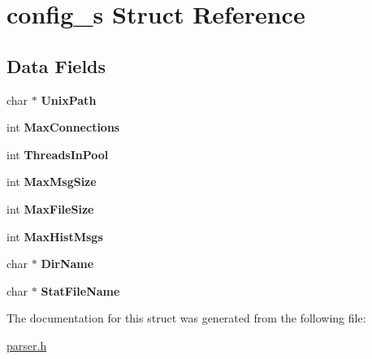 \hypertarget{structconfig__s}{}\section{config\+\_\+s Struct Reference}
\label{structconfig__s}
\subsection*{Data Fields}
\begin{DoxyCompactItemize}
\item 
\mbox{\label{structconfig__s_ab13f2c10dc85ac86a157ab17f7559e9f}} 
char $\ast$ {\bfseries Unix\+Path}
\item 
\mbox{\label{structconfig__s_a754a11e0baafd4ee9c91b521fac3902d}} 
int {\bfseries Max\+Connections}
\item 
\mbox{\label{structconfig__s_aeaf2a7c88ebe97aa191a8c09dfd4c702}} 
int {\bfseries Threads\+In\+Pool}
\item 
\mbox{\label{structconfig__s_adc4e7e822848b179dd42234cd80d8faa}} 
int {\bfseries Max\+Msg\+Size}
\item 
\mbox{\label{structconfig__s_a7f8273d236c25e67fd0046fb7d493180}} 
int {\bfseries Max\+File\+Size}
\item 
\mbox{\label{structconfig__s_ac4b68cef6412b5c9724fce730434c44e}} 
int {\bfseries Max\+Hist\+Msgs}
\item 
\mbox{\label{structconfig__s_a68cc4e6509205eeddea8429d2c05f2fe}} 
char $\ast$ {\bfseries Dir\+Name}
\item 
\mbox{\label{structconfig__s_a76aa48db65fcc5da8f8cecc5eff66104}} 
char $\ast$ {\bfseries Stat\+File\+Name}
\end{DoxyCompactItemize}


The documentation for this struct was generated from the following file\+:\begin{DoxyCompactItemize}
\item 
\hyperlink{parser_8h}{parser.\+h}\end{DoxyCompactItemize}
